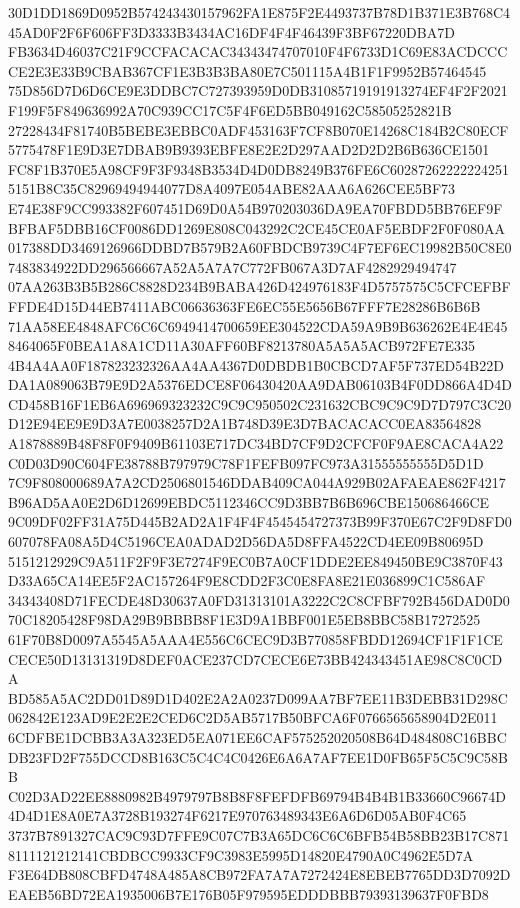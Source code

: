 \documentclass[UTF8,fontset=fandol,zihao=-4,a4paper]{ctexart}
\begin{document}
{{30D1DD1869D0952B574243430157962FA1E875F2E4493737B78D1B371E3B768C445AD0F2F6F606FF3D3333B3434AC16DF4F4F46439F3BF67220DBA7D
FB3634D46037C21F9CCFACACAC34343474707010F4F6733D1C69E83ACDCCCCE2E3E33B9CBAB367CF1E3B3B3BA80E7C501115A4B1F1F9952B57464545
75D856D7D6D6CE9E3DDBC7C727393959D0DB31085719191913274EF4F2F2021F199F5F849636992A70C939CC17C5F4F6ED5BB049162C58505252821B
27228434F81740B5BEBE3EBBC0ADF453163F7CF8B070E14268C184B2C80ECF5775478F1E9D3E7DBAB9B9393EBFE8E2E2D297AAD2D2D2B6B636CE1501
FC8F1B370E5A98CF9F3F9348B3534D4D0DB8249B376FE6C602872622222242515151B8C35C82969494944077D8A4097E054ABE82AAA6A626CEE5BF73
E74E38F9CC993382F607451D69D0A54B970203036DA9EA70FBDD5BB76EF9FBFBAF5DBB16CF0086DD1269E808C043292C2CE45CE0AF5EBDF2F0F080AA
017388DD3469126966DDBD7B579B2A60FBDCB9739C4F7EF6EC19982B50C8E07483834922DD296566667A52A5A7A7C772FB067A3D7AF4282929494747
07AA263B3B5B286C8828D234B9BABA426D424976183F4D5757575C5CFCEFBFFFDE4D15D44EB7411ABC06636363FE6EC55E5656B67FFF7E28286B6B6B
71AA58EE4848AFC6C6C6949414700659EE304522CDA59A9B9B636262E4E4E458464065F0BEA1A8A1CD11A30AFF60BF8213780A5A5A5ACB972FE7E335
4B4A4AA0F187823232326AA4AA4367D0DBDB1B0CBCD7AF5F737ED54B22DDA1A089063B79E9D2A5376EDCE8F06430420AA9DAB06103B4F0DD866A4D4D
CD458B16F1EB6A696969323232C9C9C950502C231632CBC9C9C9D7D797C3C20D12E94EE9E9D3A7E0038257D2A1B748D39E3D7BACACACC0EA83564828
A1878889B48F8F0F9409B61103E717DC34BD7CF9D2CFCF0F9AE8CACA4A22C0D03D90C604FE38788B797979C78F1FEFB097FC973A31555555555D5D1D
7C9F808000689A7A2CD2506801546DDAB409CA044A929B02AFAEAE862F4217B96AD5AA0E2D6D12699EBDC5112346CC9D3BB7B6B696CBE150686466CE
9C09DF02FF31A75D445B2AD2A1F4F4F4545454727373B99F370E67C2F9D8FD0607078FA08A5D4C5196CEA0ADAD2D56DA5D8FFA4522CD4EE09B80695D
5151212929C9A511F2F9F3E7274F9EC0B7A0CF1DDE2EE849450BE9C3870F43D33A65CA14EE5F2AC157264F9E8CDD2F3C0E8FA8E21E036899C1C586AF
34343408D71FECDE48D30637A0FD31313101A3222C2C8CFBF792B456DAD0D070C18205428F98DA29B9BBBB8F1E3D9A1BBF001E5EB8BBC58B17272525
61F70B8D0097A5545A5AAA4E556C6CEC9D3B770858FBDD12694CF1F1F1CECECE50D13131319D8DEF0ACE237CD7CECE6E73BB424343451AE98C8C0CDA
BD585A5AC2DD01D89D1D402E2A2A0237D099AA7BF7EE11B3DEBB31D298C062842E123AD9E2E2E2CED6C2D5AB5717B50BFCA6F0766565658904D2E011
6CDFBE1DCBB3A3A323ED5EA071EE6CAF575252020508B64D484808C16BBCDB23FD2F755DCCD8B163C5C4C4C0426E6A6A7AF7EE1D0FB65F5C5C9C58BB
C02D3AD22EE8880982B4979797B8B8F8FEFDFB69794B4B4B1B33660C96674D4D4D1E8A0E7A3728B193274F6217E970763489343E6A6D6D05AB0F4C65
3737B7891327CAC9C93D7FFE9C07C7B3A65DC6C6C6BFB54B58BB23B17C8718111121212141CBDBCC9933CF9C3983E5995D14820E4790A0C4962E5D7A
F3E64DB808CBFD4748A485A8CB972FA7A7A7272424E8EBEB7765DD3D7092DEAEB56BD72EA1935006B7E176B05F979595EDDDBBB79393139637F0FBD8
}}
\end{document}
